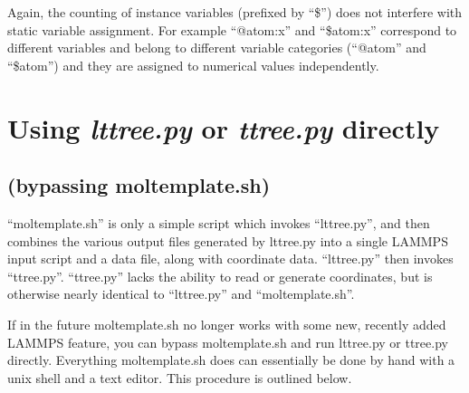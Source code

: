 \documentclass[11pt]{article}
\begin{document}
%

Again, the counting of instance variables (prefixed by ``\$'') 
does not interfere with static variable assignment.
For example ``@atom:x'' and ``\$atom:x'' 
correspond to different variables and 
belong to different variable categories
(``@atom'' and ``\$atom'')
and they are assigned to numerical values independently.



\section{Using \textit{lttree.py} or \textit{ttree.py} directly}
\subsection*{(bypassing moltemplate.sh)}
\label{sec:ttree}

``moltemplate.sh'' is only a simple script which invokes ``lttree.py'', 
and then combines the various output files generated by lttree.py into a 
single LAMMPS input script and a data file, along with coordinate data.
``lttree.py'' then invokes ``ttree.py''.
``ttree.py'' lacks the ability to read or generate coordinates, but 
is otherwise nearly identical to ``lttree.py'' and ``moltemplate.sh''.

If in the future moltemplate.sh no longer works with some new, recently added 
LAMMPS feature, you can bypass moltemplate.sh and run lttree.py
or ttree.py directly.
Everything moltemplate.sh does can essentially be done by hand with
a unix shell and a text editor.  This procedure is outlined below.
\end{document}
